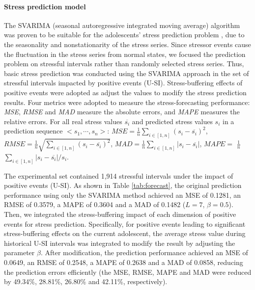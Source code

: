\documentclass[5p,times,numbers,authoryear]{elsarticle}
\begin{document}
\paragraph{Stress prediction model}
The
{SVARIMA (seasonal autoregressive integrated moving average)}
algorithm was proven to be suitable for the adolescents' stress prediction problem \citep{Li2015Predicting, Shumway2006Time},
due to the seasonality and nonstationarity of the stress series. Since stressor events cause the fluctuation in the stress series from normal states,
we focused the prediction problem on stressful intervals rather than randomly selected stress series.
Thus, basic stress prediction was conducted using the SVARIMA approach in the set of stressful intervals impacted by positive events (U-SI).
Stress-buffering effects of positive events were adopted as adjust the values to modify the stress prediction results.
Four metrics were adopted to measure the stress-forecasting performance:
\emph{MSE}, \emph{RMSE} and \emph{MAD} measure the absolute errors, and \emph{MAPE} measures the relative errors.
For all real stress values $\overline{s_i}$ and predicted stress values $s_i$ in a prediction sequence $<s_1,\cdots,s_n>$:
$MSE = \frac{1}{n}\sum_{i\in[1,n]}(s_i-\overline{s_i})^2$,
$RMSE = \frac{1}{n}\sqrt{\sum_{i\in[1,n]}(s_i-\overline{s_i})^2}$,
$MAD = \frac{1}{n}\sum_{i\in[1,n]}|s_i-\overline{s_i}|$,
$MAPE = $ $\frac{1}{n}$ $\sum_{i\in[1,n]}{|s_i-\overline{s_i}|/s_i}$.

The experimental set contained 1,914 stressful intervals under the impact of positive events (U-SI).
As shown in Table \ref{tab:forecast},
the original prediction performance using only the SVARIMA method
achieved an MSE of 0.1281, an RMSE of 0.3579, a MAPE of 0.3604 and a MAD of 0.1482 ($L = 7$, $\beta = 0.5$).
Then, we integrated the stress-buffering impact of each dimension of positive events for stress prediction.
Specifically, for positive events leading to significant stress-buffering effects on the current adolescent,
the average stress value during historical U-SI intervals was integrated to modify the result by adjusting the parameter $\beta$.
After modification, the prediction performance achieved an MSE of 0.0649, an RMSE of 0.2548, a MAPE of 0.2638 and a MAD of 0.0858,
reducing the prediction errors efficiently (the MSE, RMSE, MAPE and MAD were reduced by 49.34\%, 28.81\%, 26.80\% and 42.11\%, respectively).
\end{document}
